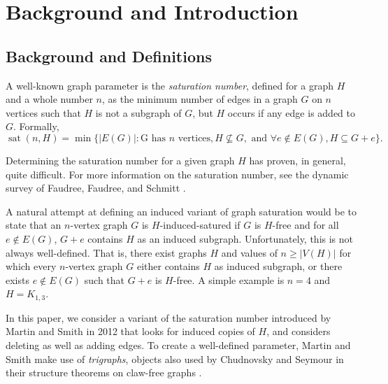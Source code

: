 \documentclass[12pt]{amsart}
\theoremstyle{plain}
\theoremstyle{definition}
\theoremstyle{remark}
\newcommand{\sat}[2]{\ensuremath{\operatorname{sat}(#1,#2)}\xspace}
\newcommand{\claw}{\ensuremath{K_{1,3}}\xspace}
\begin{document}
\maketitle

\tableofcontents
\listoftables
\listoffigures
\newpage

\section{Background and Introduction}\label{sec:intro}





\subsection{Background and Definitions}

A well-known graph parameter is the \emph{saturation number}, defined for a graph $H$ and a whole number $n$, as the minimum number of edges in a graph $G$ on $n$ vertices such that $H$ is not a subgraph of $G$, but $H$ occurs if any edge is added to $G$. Formally,
\[\sat{n}{H}=\min\{|E(G)|:\text{G has~}n \text{~vertices}, H\not\subseteq G,\text{~and~}\forall e\notin E(G), H\subseteq G+e\}.\]

Determining the saturation number for a given graph $H$ has proven, in general, quite difficult. For more information on the saturation number, see the dynamic survey of Faudree, Faudree, and Schmitt \cite{FFS}.

A natural attempt at defining an induced variant of graph saturation would be to state that an $n$-vertex graph $G$ is $H$-induced-satured if $G$ is $H$-free and for all $e \notin E(G)$, $G + e$ contains $H$ as an induced subgraph.  Unfortunately, this is not always well-defined.  That is, there exist graphs $H$ and values of $n \ge |V(H)|$ for which every $n$-vertex graph $G$ either contains $H$ as induced subgraph, or there exists $e \notin E(G)$ such that $G+e$ is $H$-free.  A simple example is $n = 4$ and $H = \claw$.

In this paper, we consider a variant of the saturation number introduced by Martin and Smith in 2012 that looks for induced copies of $H$, and considers deleting as well as adding edges. To create a well-defined parameter, Martin and Smith \cite{MS} make use of \emph{trigraphs}, objects also used by Chudnovsky and Seymour in their structure theorems on claw-free graphs \cite{CS}.
\end{document}
